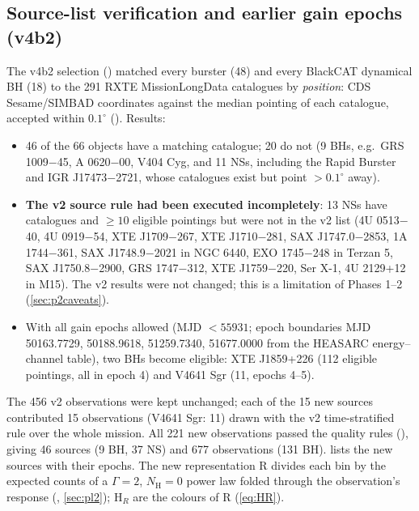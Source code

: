\subsection{Source-list verification and earlier gain epochs (v4b2)}
The v4b2 selection () matched every \citet{Galloway2008} burster (48) and every BlackCAT
dynamical BH (18) to the 291 RXTE MissionLongData catalogues by \emph{position}: CDS Sesame/SIMBAD coordinates against the
median pointing of each catalogue, accepted within $0.1^\circ$ (). Results:
\begin{itemize}
\item 46 of the 66 objects have a matching catalogue; 20 do not (9 BHs, e.g.\ GRS 1009$-$45, A 0620$-$00, V404 Cyg, and
11 NSs, including the Rapid Burster and IGR J17473$-$2721, whose catalogues exist but point $>0.1^\circ$ away).
\item \textbf{The v2 source rule had been executed incompletely}: 13 NSs have catalogues and $\ge10$ eligible pointings but
were not in the v2 list (4U 0513$-$40, 4U 0919$-$54, XTE J1709$-$267, XTE J1710$-$281, SAX J1747.0$-$2853, 1A 1744$-$361,
SAX J1748.9$-$2021 in NGC 6440, EXO 1745$-$248 in Terzan 5, SAX J1750.8$-$2900, GRS 1747$-$312, XTE J1759$-$220, Ser X-1,
4U 2129+12 in M15). The v2 results were not changed; this is a limitation of Phases 1--2 (\cref{sec:p2caveats}).
\item With all gain epochs allowed (MJD $<55931$; epoch boundaries MJD 50163.7729, 50188.9618, 51259.7340, 51677.0000 from
the HEASARC energy--channel table), two BHs become eligible: XTE J1859+226 (112 eligible pointings, all in epoch 4) and
V4641 Sgr (11, epochs 4--5).
\end{itemize}
The 456 v2 observations were kept unchanged; each of the 15 new sources contributed 15 observations (V4641 Sgr: 11) drawn
with the v2 time-stratified rule over the whole mission. All 221 new observations passed the quality rules
(), giving 46 sources (9 BH, 37 NS) and 677 observations (131 BH).
 lists the new sources with their epochs. The new representation R divides each bin by the expected
counts of a $\Gamma=2$, $N_\mathrm{H}=0$ power law folded through the observation's response (,
\cref{sec:pl2}); H$_R$ are the colours of R (\cref{eq:HR}).

